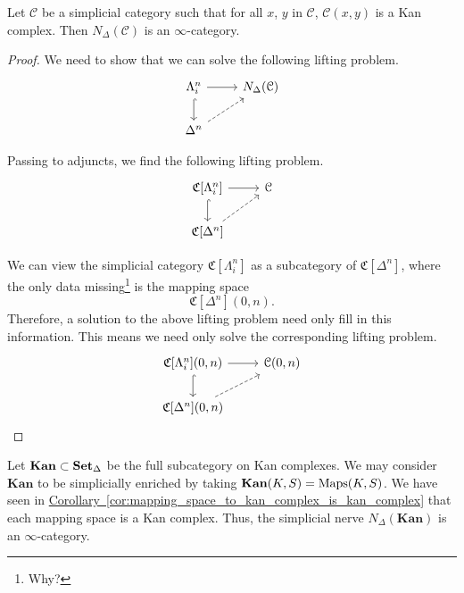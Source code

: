 \documentclass[main.tex]{subfiles}
\begin{document}
\begin{proposition}
  \label{prop:simplicial_nerve_of_category_enriched_in_kan_complexes_gives_infinity_category}
  Let $\mathcal{C}$ be a simplicial category such that for all $x$, $y$ in $\mathcal{C}$, $\mathcal{C}(x, y)$ is a Kan complex. Then $N_{\Delta}( \mathcal{C} )$ is an $\infty$-category.
\end{proposition}
\begin{proof}
  We need to show that we can solve the following lifting problem.
  \begin{equation*}
    \begin{tikzcd}
      \Lambda^{n}_{i}
      \arrow[r]
      \arrow[d, hookrightarrow]
      & N_{\Delta}(\mathcal{C})
      \\
      \Delta^{n}
      \arrow[ur, dashed]
    \end{tikzcd}
  \end{equation*}

  Passing to adjuncts, we find the following lifting problem.
  \begin{equation*}
    \begin{tikzcd}
      \mathfrak{C}[\Lambda^{n}_{i}]
      \arrow[r]
      \arrow[d, hookrightarrow]
      & \mathcal{C}
      \\
      \mathfrak{C}[\Delta^{n}]
      \arrow[ur, dashed]
    \end{tikzcd}
  \end{equation*}

  We can view the simplicial category $\mathfrak{C}[\Lambda^{n}_{i}]$ as a subcategory of $\mathfrak{C}[\Delta^{n}]$, where the only data missing\footnote{Why?} is the mapping space
  \begin{equation*}
    \mathfrak{C}[\Delta^{n}](0, n).
  \end{equation*}
  Therefore, a solution to the above lifting problem need only fill in this information. This means we need only solve the corresponding lifting problem.
  \begin{equation*}
    \begin{tikzcd}
      \mathfrak{C}[\Lambda^{n}_{i}](0, n)
      \arrow[r]
      \arrow[d, hookrightarrow]
      & \mathcal{C}(0, n)
      \\
      \mathfrak{C}[\Delta^{n}](0, n)
      \arrow[ur, dashed]
    \end{tikzcd}
  \end{equation*}
\end{proof}

\begin{example}
  Let $\mathbf{Kan} \subset \operatorname{\mathbf{Set}_{\Delta}}$ be the full subcategory on Kan complexes. We may consider $\mathbf{Kan}$ to be simplicially enriched by taking $\mathbf{Kan}(K, S) = \operatorname{Maps}(K, S)$. We have seen in \hyperref[cor:mapping_space_to_kan_complex_is_kan_complex]{Corollary~\ref*{cor:mapping_space_to_kan_complex_is_kan_complex}} that each mapping space is a Kan complex. Thus, the simplicial nerve $N_{\Delta}(\textbf{Kan})$ is an $\infty$-category.
\end{example}
\end{document}
